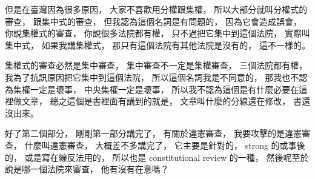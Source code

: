 \hypertarget{w06:cue:1176}{}但是在臺灣因為很多原因，
\hypertarget{w06:cue:1177}{}大家不喜歡用分權跟集權，
\hypertarget{w06:cue:1178}{}所以大部分就叫分權式的審查，
\hypertarget{w06:cue:1179}{}跟集中式的審查，
\hypertarget{w06:cue:1180}{}但我認為這個名詞是有問題的，
\hypertarget{w06:cue:1181}{}因為它會造成誤會，
\hypertarget{w06:cue:1182}{}你說集權式的審查，
\hypertarget{w06:cue:1183}{}你說很多法院都有權，
\hypertarget{w06:cue:1184}{}只不過把它集中到這個法院，
\hypertarget{w06:cue:1185}{}實際叫集中式，
\hypertarget{w06:cue:1186}{}如果我講集權式，
\hypertarget{w06:cue:1187}{}那只有這個法院有其他法院是沒有的，
\hypertarget{w06:cue:1188}{}這不一樣的。

\hypertarget{w06:cue:1189}{}集權式的審查必然是集中審查，
\hypertarget{w06:cue:1190}{}集中審查不一定是集權審查，
\hypertarget{w06:cue:1191}{}三個法院都有權，
\hypertarget{w06:cue:1192}{}我為了抗訊原因把它集中到這個法院，
\hypertarget{w06:cue:1193}{}所以這個名詞我是不同意的，
\hypertarget{w06:cue:1194}{}那我也不認為集權一定是壞事，
\hypertarget{w06:cue:1195}{}中央集權一定是壞事，
\hypertarget{w06:cue:1196}{}所以我不認為這個是有什麼必要在這裡做文章，
\hypertarget{w06:cue:1197}{}總之這個是書裡面有講到的就是，
\hypertarget{w06:cue:1198}{}文章叫什麼的分線還在修改，
\hypertarget{w06:cue:1199}{}書還沒出來。

\hypertarget{w06:cue:1200}{}好了第二個部分，
\hypertarget{w06:cue:1201}{}剛剛第一部分講完了，
\hypertarget{w06:cue:1202}{}有關於違憲審查，
\hypertarget{w06:cue:1203}{}我要攻擊的是違憲審查，
\hypertarget{w06:cue:1204}{}什麼叫違憲審查，
\hypertarget{w06:cue:1205}{}大概差不多講完了，
\hypertarget{w06:cue:1206}{}它主要是針對的，
\hypertarget{w06:cue:1207}{}strong 的或事後的，
\hypertarget{w06:cue:1208}{}或是寫在線反法用的，
\hypertarget{w06:cue:1209}{}所以也是 constitutional review 的一種，
\hypertarget{w06:cue:1210}{}然後呢至於說是哪一個法院來審查，
\hypertarget{w06:cue:1211}{}他有沒有在意嗎？

